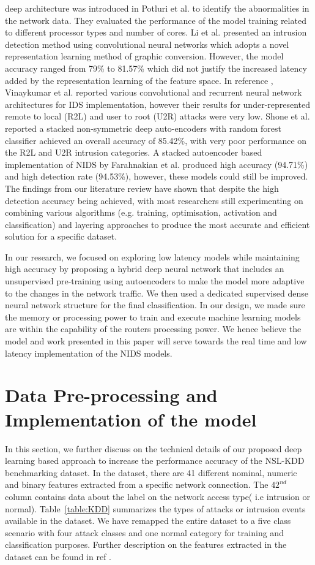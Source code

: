 \documentclass[runningheads]{llncs}
\newcommand{\tab}[1]{Table~\ref{#1}}
\begin{document}
deep architecture was introduced in Potluri et al. \cite{potluri2016} to identify the abnormalities in the network data. They evaluated the performance of the model training related to different processor types and number of cores. Li et al. \cite{Li2017} presented an intrusion detection method using convolutional neural networks which adopts a novel representation learning method of graphic conversion. However, the model accuracy ranged from 79\% to 81.57\% which did not justify the increased latency added by the representation learning of the feature space. In reference \cite{Vinay2017}, Vinaykumar et al. reported various convolutional and recurrent neural network architectures for IDS implementation, however their results for under-represented remote to local (R2L) and user to root (U2R) attacks were very low. Shone et al.\cite{Shone2018} reported a stacked non-symmetric deep auto-encoders with random forest classifier achieved an overall accuracy of 85.42\%, with very poor performance on the R2L and U2R intrusion categories. A stacked autoencoder based implementation of NIDS by Farahnakian et al.  \cite{Farah2018} produced high accuracy (94.71\%) and high detection rate (94.53\%), however, these models could still be improved. 
The findings from our literature review have shown that despite the high detection accuracy being achieved, with most researchers still experimenting
on combining various algorithms (e.g. training, optimisation, activation and classification) and layering approaches to produce the most accurate and efficient solution for a
specific dataset.

In our research, we focused on exploring low latency models while maintaining high accuracy by proposing a hybrid deep neural network that includes an unsupervised pre-training using autoencoders to make the model more adaptive to the changes in the network traffic. We then used a dedicated supervised dense neural network structure for the final classification. In our design, we made sure the memory or processing power to train and execute machine learning models are within the capability of the routers processing power. We hence believe the model and work presented in this paper will serve towards the real time and low latency implementation of the NIDS models.

\section{Data Pre-processing and Implementation of the model}
In this section, we further discuss on the technical details of our proposed deep learning based approach to increase the performance accuracy of the NSL-KDD benchmarking dataset. In the dataset, there are 41 different nominal, numeric and binary features extracted from a specific network connection. The $42^{nd}$ column contains data about the label on the network access type( i.e intrusion or normal). \tab{table:KDD} summarizes the types of attacks or intrusion events available in the dataset. We have remapped  the entire dataset to a five class scenario with four attack classes and one normal category for training and classification purposes. Further description on the features extracted in the dataset can be found in ref \cite{dhanabal2015, tavallaee2009}.
\end{document}
